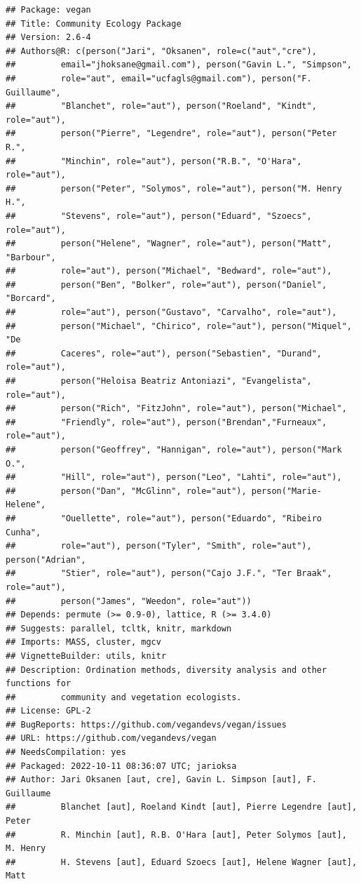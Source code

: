 \documentclass[
]{article}
\begin{document}
\begin{verbatim}
## Package: vegan
## Title: Community Ecology Package
## Version: 2.6-4
## Authors@R: c(person("Jari", "Oksanen", role=c("aut","cre"),
##         email="jhoksane@gmail.com"), person("Gavin L.", "Simpson",
##         role="aut", email="ucfagls@gmail.com"), person("F. Guillaume",
##         "Blanchet", role="aut"), person("Roeland", "Kindt", role="aut"),
##         person("Pierre", "Legendre", role="aut"), person("Peter R.",
##         "Minchin", role="aut"), person("R.B.", "O'Hara", role="aut"),
##         person("Peter", "Solymos", role="aut"), person("M. Henry H.",
##         "Stevens", role="aut"), person("Eduard", "Szoecs", role="aut"),
##         person("Helene", "Wagner", role="aut"), person("Matt", "Barbour",
##         role="aut"), person("Michael", "Bedward", role="aut"),
##         person("Ben", "Bolker", role="aut"), person("Daniel", "Borcard",
##         role="aut"), person("Gustavo", "Carvalho", role="aut"),
##         person("Michael", "Chirico", role="aut"), person("Miquel", "De
##         Caceres", role="aut"), person("Sebastien", "Durand", role="aut"),
##         person("Heloisa Beatriz Antoniazi", "Evangelista", role="aut"),
##         person("Rich", "FitzJohn", role="aut"), person("Michael",
##         "Friendly", role="aut"), person("Brendan","Furneaux", role="aut"),
##         person("Geoffrey", "Hannigan", role="aut"), person("Mark O.",
##         "Hill", role="aut"), person("Leo", "Lahti", role="aut"),
##         person("Dan", "McGlinn", role="aut"), person("Marie-Helene",
##         "Ouellette", role="aut"), person("Eduardo", "Ribeiro Cunha",
##         role="aut"), person("Tyler", "Smith", role="aut"), person("Adrian",
##         "Stier", role="aut"), person("Cajo J.F.", "Ter Braak", role="aut"),
##         person("James", "Weedon", role="aut"))
## Depends: permute (>= 0.9-0), lattice, R (>= 3.4.0)
## Suggests: parallel, tcltk, knitr, markdown
## Imports: MASS, cluster, mgcv
## VignetteBuilder: utils, knitr
## Description: Ordination methods, diversity analysis and other functions for
##         community and vegetation ecologists.
## License: GPL-2
## BugReports: https://github.com/vegandevs/vegan/issues
## URL: https://github.com/vegandevs/vegan
## NeedsCompilation: yes
## Packaged: 2022-10-11 08:36:07 UTC; jarioksa
## Author: Jari Oksanen [aut, cre], Gavin L. Simpson [aut], F. Guillaume
##         Blanchet [aut], Roeland Kindt [aut], Pierre Legendre [aut], Peter
##         R. Minchin [aut], R.B. O'Hara [aut], Peter Solymos [aut], M. Henry
##         H. Stevens [aut], Eduard Szoecs [aut], Helene Wagner [aut], Matt

\end{verbatim}
\end{document}
